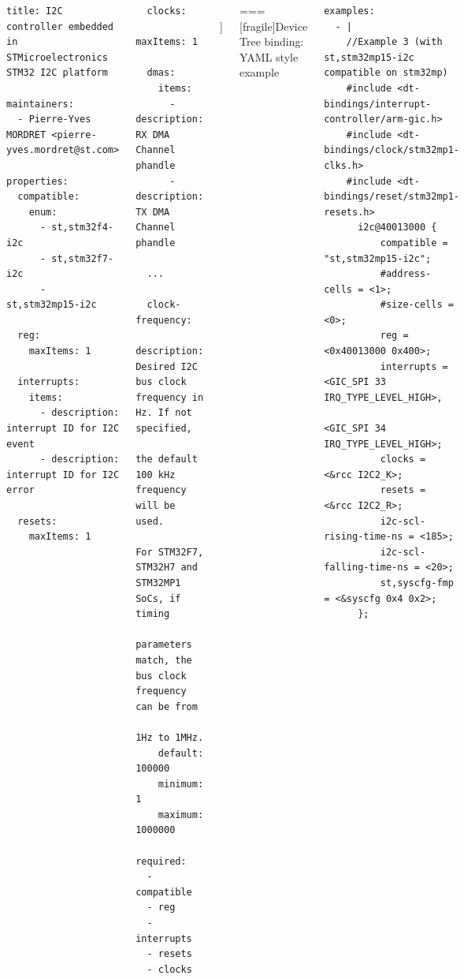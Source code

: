 \begin{columns}[t]
\begin{columns}[t]
\begin{columns}[t]
\begin{columns}[t]
\begin{block}{}
{\begin{verbatim}
title: I2C controller embedded in STMicroelectronics STM32 I2C platform

maintainers:
  - Pierre-Yves MORDRET <pierre-yves.mordret@st.com>

properties:
  compatible:
    enum:
      - st,stm32f4-i2c
      - st,stm32f7-i2c
      - st,stm32mp15-i2c

  reg:
    maxItems: 1

  interrupts:
    items:
      - description: interrupt ID for I2C event
      - description: interrupt ID for I2C error

  resets:
    maxItems: 1

\end{verbatim}
      }
    \end{block}
    \begin{block}{}
      {\fontsize{5}{6}\selectfont
\begin{verbatim}
  clocks:
    maxItems: 1

  dmas:
    items:
      - description: RX DMA Channel phandle
      - description: TX DMA Channel phandle

  ...

  clock-frequency:
    description: Desired I2C bus clock frequency in Hz. If not specified,
                 the default 100 kHz frequency will be used.
                 For STM32F7, STM32H7 and STM32MP1 SoCs, if timing
                 parameters match, the bus clock frequency can be from
                 1Hz to 1MHz.
    default: 100000
    minimum: 1
    maximum: 1000000

required:
  - compatible
  - reg
  - interrupts
  - resets
  - clocks
\end{verbatim}
      }
    \end{block}
  \\]


=== [fragile]{Device Tree binding: YAML style example}
    \begin{block}{}
      {\fontsize{5}{6}\selectfont
\begin{verbatim}
examples:
  - |
    //Example 3 (with st,stm32mp15-i2c compatible on stm32mp)
    #include <dt-bindings/interrupt-controller/arm-gic.h>
    #include <dt-bindings/clock/stm32mp1-clks.h>
    #include <dt-bindings/reset/stm32mp1-resets.h>
      i2c@40013000 {
          compatible = "st,stm32mp15-i2c";
          #address-cells = <1>;
          #size-cells = <0>;
          reg = <0x40013000 0x400>;
          interrupts = <GIC_SPI 33 IRQ_TYPE_LEVEL_HIGH>,
                       <GIC_SPI 34 IRQ_TYPE_LEVEL_HIGH>;
          clocks = <&rcc I2C2_K>;
          resets = <&rcc I2C2_R>;
          i2c-scl-rising-time-ns = <185>;
          i2c-scl-falling-time-ns = <20>;
          st,syscfg-fmp = <&syscfg 0x4 0x2>;
      };
\end{verbatim}
      }
    \end{block}



\end{columns}
\end{columns}
\end{columns}
\end{columns}
